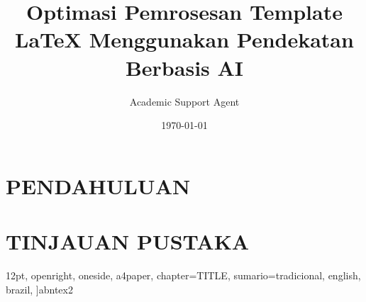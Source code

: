 \documentclass{abntex2}
\title{Optimasi Pemrosesan Template LaTeX Menggunakan Pendekatan Berbasis AI}
\author{Academic Support Agent}
\date{\today}
\begin{document}
\maketitle

\begin{abstract}

\end{abstract}

\chapter{PENDAHULUAN}


\chapter{TINJAUAN PUSTAKA}


	12pt,				    %
	openright,			    %
	oneside,			    %
	a4paper,			    %
    chapter=TITLE,         %
    sumario=tradicional,    %
	english,			    %
	brazil,				    %
	]{abntex2}              %



\usepackage{abntex2-UFV}        %
\usepackage{newtxtext,newtxmath}
\usepackage[T1]{fontenc}		%
\usepackage[utf8]{inputenc}		%
\usepackage{indentfirst}		%
\usepackage{graphicx}			%
\usepackage{booktabs}           %
\usepackage[abnt-emphasize=bf]{abntex2cite}	
\usepackage{tabularx}
\usepackage{multirow}
\usepackage{float}
\usepackage[portuguese,onelanguage,ruled,vlined]{algorithm2e}


\end{document}
